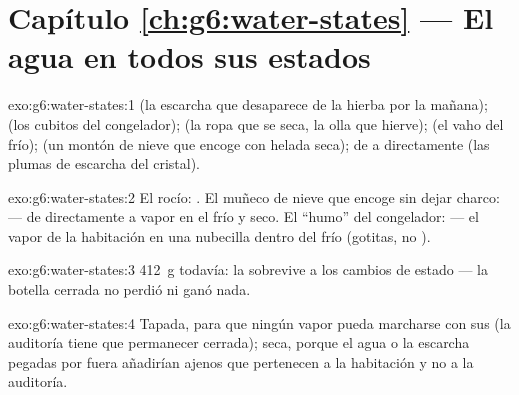 \section*{Capítulo \ref{ch:g6:water-states} --- El agua en todos sus estados}

\begin{solution}{exo:g6:water-states:1}
 (la escarcha que desaparece de la hierba por la mañana);
 (los cubitos del congelador);  (la
ropa que se seca, la olla que hierve);  (el vaho del
 frío);  (un montón de nieve que encoge con
helada seca); de  a  directamente (las plumas de
escarcha del cristal).
\end{solution}

\begin{solution}{exo:g6:water-states:2}
El rocío: . El muñeco de nieve que encoge sin dejar
charco:  --- de  directamente a vapor en el
 frío y seco. El ``humo'' del congelador:  --- el
vapor de la habitación  en una nubecilla dentro del
 frío (gotitas, no ).
\end{solution}

\begin{solution}{exo:g6:water-states:3}
\qty{412}{g} todavía: la  sobrevive a los cambios de estado ---
la botella cerrada no perdió ni ganó nada.
\end{solution}

\begin{solution}{exo:g6:water-states:4}
Tapada, para que ningún vapor pueda marcharse con sus  (la
auditoría tiene que permanecer cerrada); seca, porque el agua o la
escarcha pegadas por fuera añadirían  ajenos que pertenecen a
la habitación y no a la auditoría.
\end{solution}

